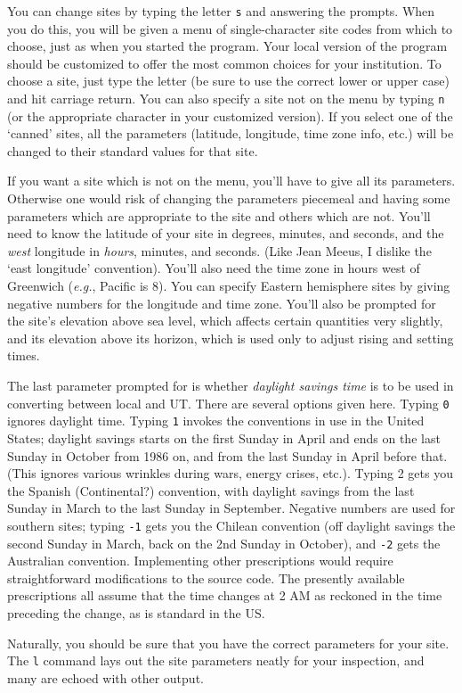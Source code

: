 You can change sites by typing the letter {\tt s} and answering the prompts.
When you do this, you will be given a menu of single-character 
site codes from which to choose, just as when you started the program.
Your local version
of the program should be customized to offer the most
common choices for your institution.  To choose a site, just
type the letter (be sure to use the correct lower or upper
case) and hit carriage return.  You can also specify 
a site not on the menu by typing {\tt n} (or the appropriate character
in your customized version).
If you select one of the `canned' sites, all the parameters
(latitude, longitude, time zone info, etc.) will be changed to
their standard values for that site.
\par
If you want a site which is not on the menu, you'll have to give
all its parameters.  Otherwise one would risk of changing 
the parameters piecemeal and having some parameters which are appropriate
to the site and others which are not.  You'll need to know the 
latitude of your site in degrees, minutes, and seconds, 
and the {\it west} longitude in {\it hours}, minutes, and seconds.
(Like Jean Meeus, I dislike the `east longitude' convention).
You'll also need the time zone in hours west of Greenwich ({\it e.g.},
Pacific is 8).  You can specify Eastern hemisphere sites by giving
negative numbers for the longitude and time zone.  You'll also be
prompted for the site's elevation above sea level, which 
affects certain quantities very slightly, and its
elevation above its horizon, which is used only
to adjust rising and setting times.
\par
The last parameter prompted for is whether {\it daylight
savings time} is to be used in converting between local and UT.  There
are several options given here.  Typing {\tt 0} ignores daylight
time.  Typing {\tt 1} invokes the conventions in use in the
United States; daylight savings starts on the first
Sunday in April and ends on the last Sunday in October from 1986 on,
and from the last Sunday in April before that.  (This ignores
various wrinkles during wars, energy crises, etc.).  Typing 2 gets
you the Spanish (Continental?) convention, with daylight
savings from the last Sunday in March to the last Sunday
in September.  Negative numbers are used for southern sites; 
typing {\tt -1} gets you the Chilean convention
(off daylight savings the second Sunday in March, back
on the 2nd Sunday in October), and {\tt -2} gets the
Australian convention.  Implementing other prescriptions would require 
straightforward modifications
to the source code.  The presently available  
prescriptions all assume
that the time changes at 2 AM as reckoned in the time preceding the
change, as is standard in the US.
\par
Naturally, you should be sure that you have the correct parameters
for your site.  The {\tt l} command lays out the site parameters
neatly for your inspection, and many are echoed with other output.

